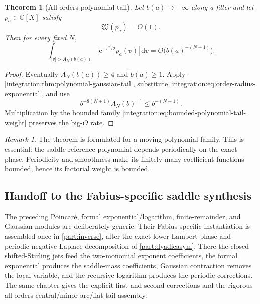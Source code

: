 \documentclass[11pt,oneside]{article}
\newtheorem{theorem}{Theorem}[section]
\theoremstyle{definition}
\theoremstyle{remark}
\newtheorem{remark}[remark]{Remark}
\newcommand{\C}{\mathbb C}
\newcommand{\e}{\mathrm e}
\newcommand{\dd}{\,\mathrm d}
\begin{document}
\begin{theorem}[All-orders polynomial tail]
\label{integration:thm:all-orders-polynomial-tail}
Let $b(a)\to+\infty$ along a filter and let $p_a\in\C[X]$ satisfy
\begin{equation}
 \mathfrak W(p_a)=O(1).
 \label{integration:eq:bounded-polynomial-tail-weight}
\end{equation}
Then for every fixed $N$,
\begin{equation}
 \int_{|v|>A_N(b(a))}
 \left|\e^{-v^2/2}p_a(v)\right|\dd v
 =O\bigl(b(a)^{-(N+1)}\bigr).
 \label{integration:eq:all-orders-polynomial-tail}
\end{equation}
\end{theorem}

\begin{proof}
Eventually $A_N(b(a))\ge4$ and $b(a)\ge1$.  Apply
\cref{integration:thm:polynomial-gaussian-tail}, substitute
\eqref{integration:eq:order-radius-exponential}, and use
\[
 b^{-8(N+1)}A_N(b)^{-1}\le b^{-(N+1)}.
\]
Multiplication by the bounded family \eqref{integration:eq:bounded-polynomial-tail-weight} preserves the
big-$O$ rate.
\end{proof}

\begin{remark}
The theorem is formulated for a moving polynomial family.  This is essential: the saddle
reference polynomial depends periodically on the exact phase.  Periodicity and smoothness
make its finitely many coefficient functions bounded, hence its factorial weight is bounded.
\end{remark}

\subsection{Handoff to the Fabius-specific saddle synthesis}
\label{integration:sec:saddle-jets}
\label{integration:sec:saddle-coeff-engine}
\label{integration:sec:second-correction}
\label{integration:sec:full-assembly}
\label{integration:sec:exact-phase-boundary}
The preceding Poincar\'e, formal exponential/logarithm, finite-remainder, and Gaussian
modules are deliberately generic.  Their Fabius-specific instantiation is assembled once
in \cref{part:inverse}, after the exact lower-Lambert phase and periodic negative-Laplace
decomposition of \cref{part:dyadicasym}.  There the closed shifted-Stirling jets feed the
two-monomial exponent coefficients, the formal exponential produces the saddle-mass
coefficients, Gaussian contraction removes the local variable, and the recursive logarithm
produces the periodic corrections.  The same chapter gives the explicit first and second
corrections and the rigorous all-orders central/minor-arc/flat-tail assembly.
\end{document}
